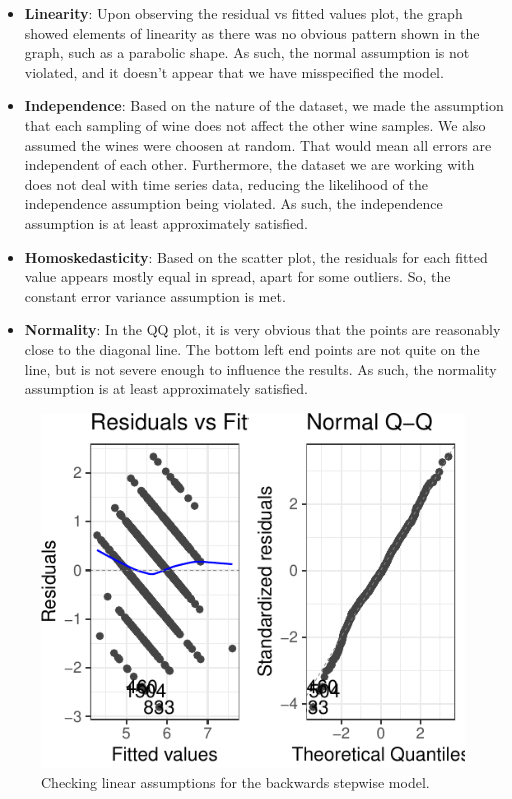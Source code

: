 \documentclass[a4paper,9pt,twocolumn,twoside,]{pinp}
\providecommand{\tightlist}{%
  \setlength{\itemsep}{0pt}\setlength{\parskip}{0pt}}
\begin{document}
\begin{itemize}
\tightlist
\item
  \textbf{Linearity}: Upon observing the residual vs fitted values plot,
  the graph showed elements of linearity as there was no obvious pattern
  shown in the graph, such as a parabolic shape. As such, the normal
  assumption is not violated, and it doesn't appear that we have
  misspecified the model.
\item
  \textbf{Independence}: Based on the nature of the dataset, we made the
  assumption that each sampling of wine does not affect the other wine
  samples. We also assumed the wines were choosen at random. That would
  mean all errors are independent of each other. Furthermore, the
  dataset we are working with does not deal with time series data,
  reducing the likelihood of the independence assumption being violated.
  As such, the independence assumption is at least approximately
  satisfied.\\
\item
  \textbf{Homoskedasticity}: Based on the scatter plot, the residuals
  for each fitted value appears mostly equal in spread, apart for some
  outliers. So, the constant error variance assumption is met.
\item
  \textbf{Normality}: In the QQ plot, it is very obvious that the points
  are reasonably close to the diagonal line. The bottom left end points
  are not quite on the line, but is not severe enough to influence the
  results. As such, the normality assumption is at least approximately
  satisfied.
\end{itemize}

\begin{figure}

{\centering \includegraphics{Executive_Summary_files/figure-latex/unnamed-chunk-3-1} 

}

\caption{Checking linear assumptions for the backwards stepwise model.}\label{fig:unnamed-chunk-3}
\end{figure}
\end{document}
